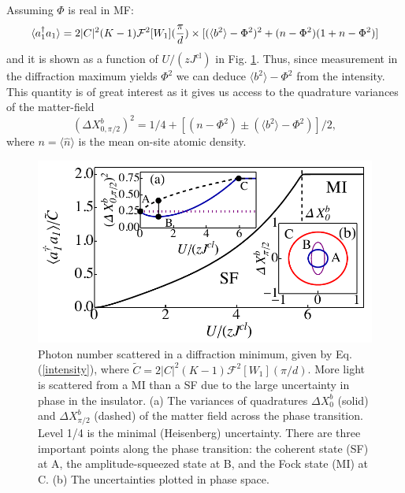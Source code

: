 Assuming $\Phi$ is real in MF:
\begin{equation}
  \label{intensity} 
  \langle a^\dagger_1 a_1 \rangle = 2 |C|^2(K-1)\mathcal{F}^2[W_1](\frac{\pi}{d})
  \times [ ( \langle b^2 \rangle - \Phi^2 )^2 + ( n - \Phi^2 ) ( 1 +n - \Phi^2 ) ]
\end{equation} 
and it is shown as a function of $U/(zJ^\text{cl})$ in
Fig. \ref{Quads}. Thus, since measurement in the diffraction maximum
yields $\Phi^2$ we can deduce $\langle b^2 \rangle - \Phi^2$ from the
intensity. This quantity is of great interest as it gives us access to
the quadrature variances of the matter-field
\begin{equation} 
  (\Delta X^b_{0,\pi/2})^2 = 1/4 + [(n - \Phi^2) \pm
  (\langle b^2 \rangle - \Phi^2)]/2,
\end{equation} 
where $n=\langle\hat{n}\rangle$ is the mean on-site atomic density.

\begin{figure}[htbp!]
  \centering
  \includegraphics[width=\linewidth]{Quads}
  \captionsetup{justification=centerlast,font=small}
  \caption[Mean-Field Matter Quadratures]{Photon number scattered in a
    diffraction minimum, given by Eq. (\ref{intensity}), where
    $\tilde{C} = 2 |C|^2 (K-1) \mathcal{F}^2 [W_1](\pi/d)$.  More
    light is scattered from a MI than a SF due to the large
    uncertainty in phase in the insulator. (a) The variances of
    quadratures $\Delta X^b_0$ (solid) and $\Delta X^b_{\pi/2}$
    (dashed) of the matter field across the phase transition. Level
    1/4 is the minimal (Heisenberg) uncertainty. There are three
    important points along the phase transition: the coherent state
    (SF) at A, the amplitude-squeezed state at B, and the Fock state
    (MI) at C. (b) The uncertainties plotted in phase space.}
	\label{Quads}
\end{figure}


